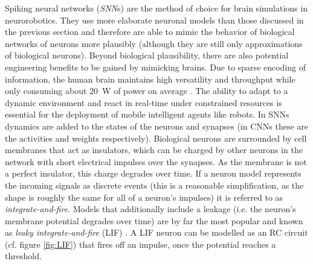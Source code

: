Spiking neural networks (\emph{SNN}s) are the method of choice for brain simulations in neurorobotics. They use more elaborate neuronal models than those discussed in the previous section and therefore are able to mimic the behavior of biological networks of neurons more plausibly (although they are still only approximations of biological neurons). Beyond biological plausibility, there are also potential engineering benefits to be gained by mimicking brains. Due to sparse encoding of information, the human brain maintains high versatility and throughput while only consuming about \SI{20}{\watt} of power on average \cite{brainexplained}. The ability to adapt to a dynamic environment and react in real-time under constrained resources is essential for the deployment of mobile intelligent agents like robots. In SNNs dynamics are added to the states of the neurons and synapses (in CNNs these are the activities and weights respectively). Biological neurons are surrounded by cell membranes that act as insulators, which can be charged by other neurons in the network with short electrical impulses over the synapses. As the membrane is not a perfect insulator, this charge degrades over time. If a neuron model represents the incoming signals as discrete events (this is a reasonable simplification, as the shape is roughly the same for all of a neuron's impulses) it is referred to as \emph{integrate-and-fire}. Models that additionally include a leakage (i.e. the neuron's membrane potential degrades over time) are by far the most popular and known as \emph{leaky integrate-and-fire} (LIF) \cite{hodgkin1952quantitative,burkitt2006review}. A LIF neuron can be modelled as an RC circuit (cf. figure \ref{fig:LIF}) that fires off an impulse, once the potential reaches a threshold.

